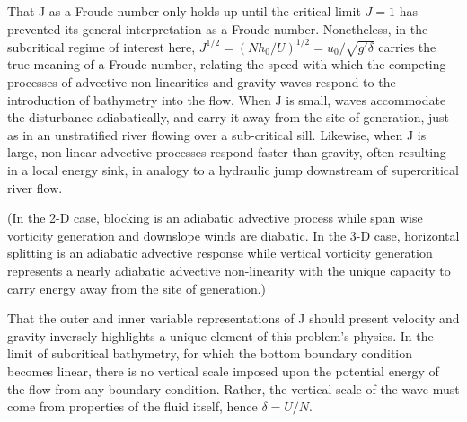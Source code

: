 \documentclass[12pt]{article}
\begin{document}
That J as a Froude number only holds up until the critical limit $J=1$ has prevented its general interpretation as a Froude number. Nonetheless, in the subcritical regime of interest here, $J^{1/2}=(Nh_0/U)^{1/2}=u_0/\sqrt{g'\delta}$ carries the true meaning of a Froude number, relating the speed with which the competing processes of advective non-linearities and gravity waves respond to the introduction of bathymetry into the flow. When J is small, waves accommodate the disturbance adiabatically, and carry it away from the site of generation, just as in an unstratified river flowing over a sub-critical sill. Likewise, when J is large, non-linear advective processes respond faster than gravity, often resulting in a local energy sink, in analogy to a hydraulic jump downstream of supercritical river flow.

(In the 2-D case, blocking is an adiabatic advective process while span wise vorticity generation and downslope winds are diabatic. In the 3-D case, horizontal splitting is an adiabatic advective response while vertical vorticity generation represents a nearly adiabatic advective non-linearity with the unique capacity to carry energy away from the site of generation.)

That the outer and inner variable representations of J should present velocity and gravity inversely highlights a unique element of this problem's physics. In the limit of subcritical bathymetry, for which the bottom boundary condition becomes linear,  there is no vertical scale imposed upon the potential energy of the flow from any boundary condition. Rather, the vertical scale of the wave must come from properties of the fluid itself, hence $\delta = U/N$. 

\end{document}
